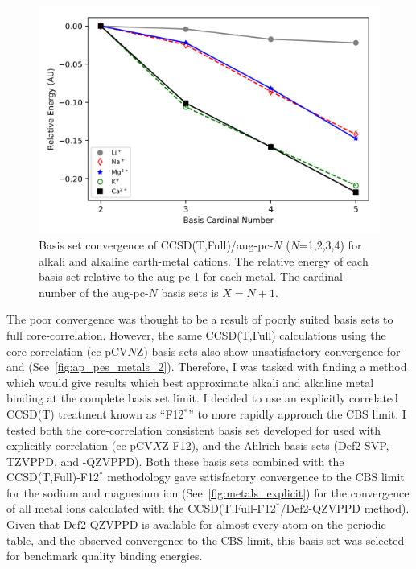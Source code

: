 \begin{doublespace}
\begin{figure}[!htbp]
  \centering
    \includegraphics[width=\textwidth]{figures/pes_metals}
    \caption[Basis set convergence for alkali and alkaline earth-metal
    cations.]{Basis set convergence of CCSD(T,Full)/aug-pc-$N$ ($N$=1,2,3,4)
    for alkali and alkaline earth-metal cations. The relative energy of each
    basis set relative to the aug-pc-1 for each metal. The cardinal number of
    the aug-pc-$N$ basis sets is $X=N+1$.} \label{fig:ap_pes_metals}
\end{figure}

The poor convergence was thought to be a result of poorly suited basis sets to
full core-correlation. However, the same CCSD(T,Full) calculations using the
core-correlation (cc-pCV$N$Z) basis sets also show unsatisfactory convergence
for  and  (See~\ref{fig:ap_pes_metals_2}). Therefore, I was
tasked with finding a method which would give results which best approximate
alkali and alkaline metal binding at the complete basis set limit. I decided to
use an explicitly correlated CCSD(T) treatment known as ``F12$^*$'' to more
rapidly approach the CBS limit.\cite{Tenno2012} I tested both the
core-correlation consistent basis set developed for used with explicitly
correlation (cc-pCV$X$Z-F12),\cite{Peterson2008} and the Ahlrich basis sets
(Def2-SVP,-TZVPPD, and -QZVPPD).\cite{Rappoport2010} Both these basis sets
combined with the CCSD(T,Full)-F12$^*$ methodology gave satisfactory convergence
to the CBS limit for the sodium and magnesium ion
(See~\ref{fig:metals_explicit}) for the convergence of all metal ions calculated
with the CCSD(T,Full-F12$^*$/Def2-QZVPPD method). Given that Def2-QZVPPD is
available for almost every atom on the periodic table, and the observed
convergence to the CBS limit, this basis set was selected for benchmark quality
binding energies.


\end{doublespace}
